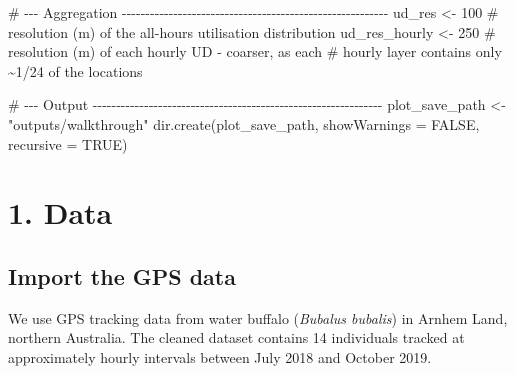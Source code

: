 \documentclass[
  letterpaper,
  DIV=11,
  numbers=noendperiod]{scrartcl}
\newenvironment{Shaded}{\begin{snugshade}}{\end{snugshade}}
\newcommand{\AttributeTok}[1]{\textcolor[rgb]{0.40,0.45,0.13}{#1}}
\newcommand{\CommentTok}[1]{\textcolor[rgb]{0.37,0.37,0.37}{#1}}
\newcommand{\ConstantTok}[1]{\textcolor[rgb]{0.56,0.35,0.01}{#1}}
\newcommand{\DecValTok}[1]{\textcolor[rgb]{0.68,0.00,0.00}{#1}}
\newcommand{\FunctionTok}[1]{\textcolor[rgb]{0.28,0.35,0.67}{#1}}
\newcommand{\NormalTok}[1]{\textcolor[rgb]{0.00,0.23,0.31}{#1}}
\newcommand{\OtherTok}[1]{\textcolor[rgb]{0.00,0.23,0.31}{#1}}
\newcommand{\SpecialCharTok}[1]{\textcolor[rgb]{0.37,0.37,0.37}{#1}}
\newcommand{\StringTok}[1]{\textcolor[rgb]{0.13,0.47,0.30}{#1}}
\begin{document}
\begin{Shaded}
\begin{Highlighting}[]
\CommentTok{\# {-}{-}{-} Aggregation {-}{-}{-}{-}{-}{-}{-}{-}{-}{-}{-}{-}{-}{-}{-}{-}{-}{-}{-}{-}{-}{-}{-}{-}{-}{-}{-}{-}{-}{-}{-}{-}{-}{-}{-}{-}{-}{-}{-}{-}{-}{-}{-}{-}{-}{-}{-}{-}{-}{-}{-}{-}{-}{-}{-}{-}{-}}
\NormalTok{ud\_res        }\OtherTok{\textless{}{-}} \DecValTok{100}   \CommentTok{\# resolution (m) of the all{-}hours utilisation distribution}
\NormalTok{ud\_res\_hourly }\OtherTok{\textless{}{-}} \DecValTok{250}   \CommentTok{\# resolution (m) of each hourly UD {-} coarser, as each}
                       \CommentTok{\# hourly layer contains only \textasciitilde{}1/24 of the locations}

\CommentTok{\# {-}{-}{-} Output {-}{-}{-}{-}{-}{-}{-}{-}{-}{-}{-}{-}{-}{-}{-}{-}{-}{-}{-}{-}{-}{-}{-}{-}{-}{-}{-}{-}{-}{-}{-}{-}{-}{-}{-}{-}{-}{-}{-}{-}{-}{-}{-}{-}{-}{-}{-}{-}{-}{-}{-}{-}{-}{-}{-}{-}{-}{-}{-}{-}{-}{-}}
\NormalTok{plot\_save\_path }\OtherTok{\textless{}{-}} \StringTok{"outputs/walkthrough"}
\FunctionTok{dir.create}\NormalTok{(plot\_save\_path, }\AttributeTok{showWarnings =} \ConstantTok{FALSE}\NormalTok{, }\AttributeTok{recursive =} \ConstantTok{TRUE}\NormalTok{)}
\end{Highlighting}
\end{Shaded}

\section{1. Data}\label{data}

\subsection{Import the GPS data}\label{import-the-gps-data}

We use GPS tracking data from water buffalo (\emph{Bubalus bubalis}) in
Arnhem Land, northern Australia. The cleaned dataset contains 14
individuals tracked at approximately hourly intervals between July 2018
and October 2019.

\begin{Shaded}
\end{Shaded}
\end{document}
